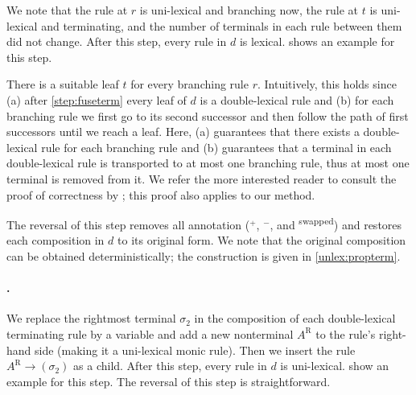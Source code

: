 \documentclass[../document.tex]{subfiles}
\begin{document}
    We note that the rule at $r$ is uni-lexical and branching now, the rule at \(t\) is uni-lexical and terminating, and the number of terminals in each rule between them did not change.
    After this step, every rule in $d$ is lexical.
     shows an example for this step.

    There is a suitable leaf $t$ for every branching rule $r$.
    Intuitively, this holds since (a) after \cref{step:fuseterm} every leaf of $d$ is a double-lexical rule and (b) for each branching rule we first go to its second successor and then follow the path of first successors until we reach a leaf.
    Here, (a) guarantees that there exists a double-lexical rule for each branching rule and (b) guarantees that a terminal in each double-lexical rule is transported to at most one branching rule, thus at most one terminal is removed from it.
    We refer the more interested reader to consult the proof of correctness by \citet{EngMalMan18};
    this proof also applies to our method.

    The reversal of this step removes all annotation ($^+$, $^-$, and \textsuperscript{swapped}) and restores each composition in $d$ to its original form.
    We note that the original composition can be obtained deterministically; the construction is given in \cref{unlex:propterm}.

    \paragraph{.}
    We replace the rightmost terminal $\sigma_2$ in the composition of each double-lexical terminating rule by a variable and add a new nonterminal $A^{\text{R}}$ to the rule's right-hand side (making it a uni-lexical monic rule).
    Then we insert the rule $A^{\text{R}} \to (\sigma_2)$ as a child.
    After this step, every rule in $d$ is uni-lexical.
     show an example for this step.
    The reversal of this step is straightforward.
\end{document}
